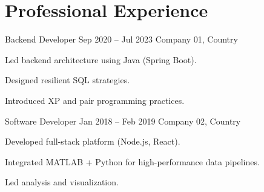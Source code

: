 
\section*{Professional Experience}

\experience
  {Backend Developer}
  {Sep 2020 – Jul 2023}
  {Company 01, Country}
  {
    \item Led backend architecture using Java (Spring Boot).
    \item Designed resilient SQL strategies.
    \item Introduced XP and pair programming practices.
  }

\vspace{0.5em}

\experience
  {Software Developer}
  {Jan 2018 – Feb 2019}
  {Company 02, Country}
  {
    \item Developed full-stack platform (Node.js, React).
    \item Integrated MATLAB + Python for high-performance data pipelines.
    \item Led analysis and visualization.
  }
